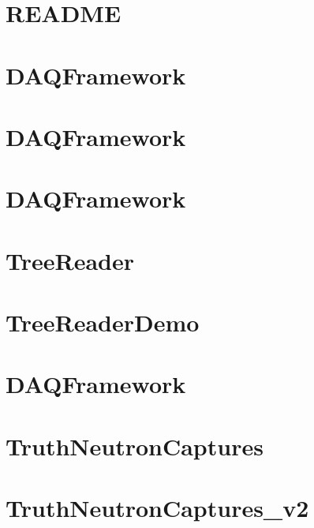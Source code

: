 \let\mypdfximage\pdfximage\def\pdfximage{\immediate\mypdfximage}\documentclass[twoside]{book}
\newcommand{\+}{\discretionary{\mbox{\scriptsize$\hookleftarrow$}}{}{}}
\begin{document}
\chapter{README}
\label{md_UserTools_SimplifyTree_README}

\chapter{DAQFramework}
\label{md_UserTools_SK2p2MeV_README}

\chapter{DAQFramework}
\label{md_UserTools_template_README}

\chapter{DAQFramework}
\label{md_UserTools_TestTool_README}

\chapter{Tree\+Reader}
\label{md_UserTools_TreeReader_README}

\chapter{Tree\+Reader\+Demo}
\label{md_UserTools_TreeReaderDemo_README}

\chapter{DAQFramework}
\label{md_UserTools_TrueNCaptures_README}

\chapter{Truth\+Neutron\+Captures}
\label{md_UserTools_TruthNeutronCaptures_README}

\chapter{Truth\+Neutron\+Captures\+\_\+v2}
\label{md_UserTools_TruthNeutronCaptures_v2_README}

\end{document}
